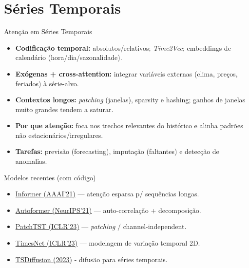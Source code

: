 \documentclass{beamer}
\begin{document}

\section{Séries Temporais}
\begin{frame}{Atenção em Séries Temporais}
\begin{itemize}
  \item \textbf{Codificação temporal:} absolutos/relativos; \textit{Time2Vec}; embeddings de calendário (hora/dia/sazonalidade).
  \item \textbf{Exógenas + cross-attention:} integrar variáveis externas (clima, preços, feriados) à série-alvo.
  \item \textbf{Contextos longos:} \textit{patching} (janelas), sparsity e hashing; ganhos de janelas muito grandes tendem a saturar.
  \item \textbf{Por que atenção:} foca nos trechos relevantes do histórico e alinha padrões não estacionários/irregulares.
  \item \textbf{Tarefas:} previsão (forecasting), imputação (faltantes) e detecção de anomalias.
\end{itemize}
\end{frame}

\begin{frame}{Modelos recentes (com código)}
\footnotesize
\begin{itemize}
  \item \href{https://github.com/zhouhaoyi/Informer2020}{Informer (AAAI'21)} — atenção esparsa p/ sequências longas.
  \item \href{https://github.com/thuml/Autoformer}{Autoformer (NeurIPS'21)} — auto-correlação + decomposição.
  \item \href{https://github.com/yuqinie98/PatchTST}{PatchTST (ICLR'23)} — \textit{patching} / channel-independent.
  \item \href{https://github.com/thuml/TimesNet}{TimesNet (ICLR'23)} — modelagem de variação temporal 2D.
  \item \href{https://github.com/natmourajr/CPE883-2025-02/tree/main/models/tsdiffusion}{TSDiffusion (2023)} - difusão para séries temporais.
\end{itemize}
\end{frame}
\end{document}
